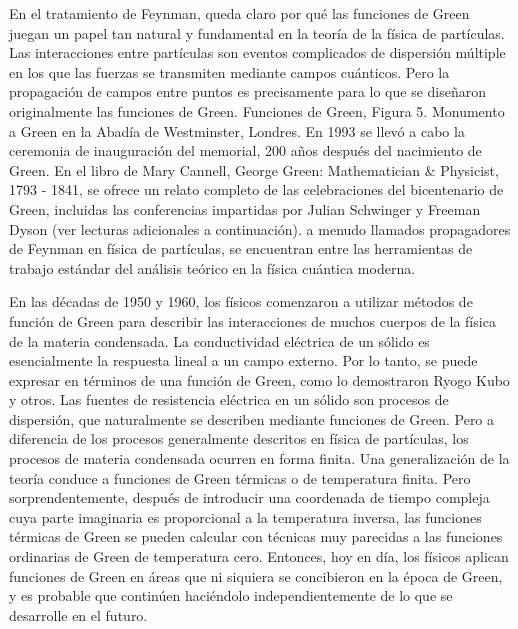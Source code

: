 En el tratamiento de Feynman, queda claro por qué las funciones de Green juegan un papel tan natural y fundamental en la teoría de la física de partículas. Las interacciones entre partículas son eventos complicados de dispersión múltiple en los que las fuerzas se transmiten mediante campos cuánticos. Pero la propagación de campos entre puntos es precisamente para lo que se diseñaron originalmente las funciones de Green. Funciones de Green, Figura 5. Monumento a Green en la Abadía de Westminster, Londres. En 1993 se llevó a cabo la ceremonia de inauguración del memorial, 200 años después del nacimiento de Green. En el libro de Mary Cannell, George Green: Mathematician $\&$ Physicist, 1793 - 1841, se ofrece un relato completo de las celebraciones del bicentenario de Green, incluidas las conferencias impartidas por Julian Schwinger y Freeman Dyson (ver lecturas adicionales a continuación). a menudo llamados propagadores de Feynman en física de partículas, se encuentran entre las herramientas de trabajo estándar del análisis teórico en la física cuántica moderna.
\par
En las décadas de 1950 y 1960, los físicos comenzaron a utilizar métodos de función de Green para describir las interacciones de muchos cuerpos de la física de la materia condensada. La conductividad eléctrica de un sólido es esencialmente la respuesta lineal a un campo externo. Por lo tanto, se puede expresar en términos de una función de Green, como lo demostraron Ryogo Kubo y otros. Las fuentes de resistencia eléctrica en un sólido son procesos de dispersión, que naturalmente se describen mediante funciones de Green. Pero a diferencia de los procesos generalmente descritos en física de partículas, los procesos de materia condensada ocurren en forma finita. Una generalización de la teoría conduce a funciones de Green térmicas o de temperatura finita. Pero sorprendentemente, después de introducir una coordenada de tiempo compleja cuya parte imaginaria es proporcional a la temperatura inversa, las funciones térmicas de Green se pueden calcular con técnicas muy parecidas a las funciones ordinarias de Green de temperatura cero. Entonces, hoy en día, los físicos aplican funciones de Green en áreas que ni siquiera se concibieron en la época de Green, y es probable que continúen haciéndolo independientemente de lo que se desarrolle en el futuro.

\newpage

